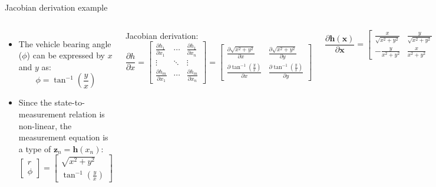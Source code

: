 \begin{frame}{Jacobian derivation example}
\begin{columns}
\begin{itemize}
    
    \item The vehicle bearing angle (\(\phi\)) can be expressed by \(x\) and \(y\) as:
\[
\phi = \tan^{-1} \left(\frac{y}{x}\right)
\]

\item Since the state-to-measurement relation is non-linear, the measurement equation is a type of \(\mathbf{z}_n = \mathbf{h}(x_n)\):
\[
\begin{bmatrix}
r \\
\phi
\end{bmatrix}
=
\begin{bmatrix}
\sqrt{x^2 + y^2} \\
\tan^{-1} \left(\frac{y}{x}\right)
\end{bmatrix}
\]
\end{itemize}
Jacobian derivation:
\[
\frac{\partial h}{\partial x} =\!\!
\begin{bmatrix}
\frac{\partial h_1}{\partial x_1} & \!\!\!\!\cdots \!\!\!\!& \frac{\partial h_1}{\partial x_n} \\
\vdots & \ddots & \vdots \\
\frac{\partial h_m}{\partial x_1} & \!\!\!\! \cdots \!\!\!\!& \frac{\partial h_m}{\partial x_n}
\end{bmatrix}
\!\!=\!\!
\begin{bmatrix}
\frac{\partial \sqrt{x^2 + y^2}}{\partial x} \!\!&\!\! \frac{\partial \sqrt{x^2 + y^2}}{\partial y} \\
\frac{\partial \tan^{-1} \left(\frac{y}{x}\right)}{\partial x} \!\!&\!\! \frac{\partial \tan^{-1} \left(\frac{y}{x}\right)}{\partial y}
\end{bmatrix}
\]

\[
\frac{\partial \mathbf{h}(\mathbf{x})}{\partial \mathbf{x}} =
\begin{bmatrix}
\frac{x}{\sqrt{x^2 + y^2}} & \frac{y}{\sqrt{x^2 + y^2}} \\
-\frac{y}{x^2 + y^2} & \frac{x}{x^2 + y^2}
\end{bmatrix}
\]

\end{columns}
\end{frame}


